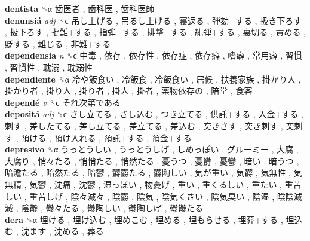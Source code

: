 \textbf{dentista} ␝α   歯医者 ,  歯科医 ,  歯科医師   \\
\textbf{denunsiá} \emph{adj}  ␝ϲ   吊し上げる ,  吊るし上げる ,  寝返る ,  弾劾+する ,  扱き下ろす ,  扱下ろす ,  批難+する ,  指弾+する ,  排撃+する ,  糺弾+する ,  裏切る ,  責める ,  貶する ,  難じる ,  非難+する   \\
\textbf{dependensia} \emph{n}  ␝ϲ   中毒 ,  依存 ,  依存性 ,  依存症 ,  依存癖 ,  嗜癖 ,  常用癖 ,  習慣 ,  習慣性 ,  耽溺 ,  耽溺性   \\
\textbf{dependiente} ␝α   冷や飯食い ,  冷飯食 ,  冷飯食い ,  居候 ,  扶養家族 ,  掛かり人 ,  掛かり者 ,  掛り人 ,  掛り者 ,  掛人 ,  掛者 ,  薬物依存の ,  陪堂 ,  食客   \\
\textbf{dependé} \emph{v}  ␝ϲ   それ次第である   \\
\textbf{depositá} \emph{adj}  ␝ϲ   さし立てる ,  さし込む ,  つき立てる ,  供託+する ,  入金+する ,  刺す ,  差したてる ,  差し立てる ,  差立てる ,  差込む ,  突きさす ,  突き刺す ,  突刺す ,  預ける ,  預け入れる ,  預託+する ,  預金+する   \\
\textbf{depresivo} ␝α   うっとうしい ,  うっとうしげ ,  しめっぽい ,  グルーミー ,  大腐 ,  大腐り ,  悄々たる ,  悄悄たる ,  悄然たる ,  憂うつ ,  憂欝 ,  憂鬱 ,  暗い ,  暗うつ ,  暗澹たる ,  暗然たる ,  暗鬱 ,  欝欝たる ,  欝陶しい ,  気が重い ,  気欝 ,  気無性 ,  気無精 ,  気鬱 ,  沈痛 ,  沈鬱 ,  湿っぽい ,  物憂げ ,  重い ,  重くるしい ,  重たい ,  重苦しい ,  重苦しげ ,  陰々滅々 ,  陰欝 ,  陰気 ,  陰気くさい ,  陰気臭い ,  陰湿 ,  陰陰滅滅 ,  陰鬱 ,  鬱々たる ,  鬱陶しい ,  鬱陶しげ ,  鬱鬱たる   \\
\textbf{dera} ␝α   埋ける ,  埋け込む ,  埋めこむ ,  埋める ,  埋もらせる ,  埋葬+する ,  埋込む ,  沈ます ,  沈める ,  葬る   \\

